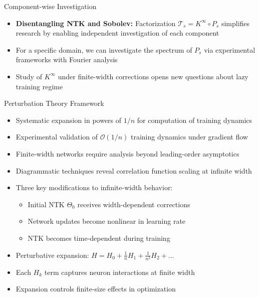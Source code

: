 \documentclass{beamer}
\begin{document}
  
\begin{frame}{Component-wise Investigation}
  \begin{itemize}
  \item \textbf{Disentangling NTK and Sobolev:} Factorization $\mathcal{T}_s = K^{\infty} \circ P_s$ simplifies research by enabling independent investigation of each component
  
  \item For a specific domain, we can investigate the spectrum of $P_s$ via experimental frameworks with Fourier analysis
  
  \item Study of $K^{\infty}$ under finite-width corrections opens new questions about lazy training regime
  \end{itemize}
  \end{frame}



\begin{frame}{Perturbation Theory Framework}
  \begin{itemize}
    \item Systematic expansion in powers of $1/n$ for computation of training dynamics
    
    \item Experimental validation of $\mathcal{O}(1/n)$ training dynamics under gradient flow
    
    \item Finite-width networks require analysis beyond leading-order asymptotics
    
    \item Diagrammatic techniques reveal correlation function scaling at infinite width
    
    \item Three key modifications to infinite-width behavior:
    \begin{itemize}
      \item Initial NTK $\Theta_0$ receives width-dependent corrections
      \item Network updates become nonlinear in learning rate
      \item NTK becomes time-dependent during training
    \end{itemize}
    
    \item Perturbative expansion: $H = H_0 + \frac{1}{n}H_1 + \frac{1}{n^2}H_2 + ...$
    
    \item Each $H_k$ term captures neuron interactions at finite width
    
    \item Expansion controls finite-size effects in optimization
  \end{itemize}
\end{frame}
  
\end{document}
